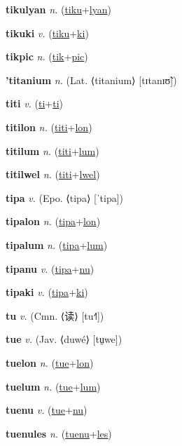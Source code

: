 \textbf{\hypertarget{tikulyan}{tikulyan}} \textit{n.} (\hyperlink{tiku}{tiku}+\allowbreak \hyperlink{lyan}{lyan})


\textbf{\hypertarget{tikuki}{tikuki}} \textit{v.} (\hyperlink{tiku}{tiku}+\allowbreak \hyperlink{ki}{ki})


\textbf{\hypertarget{tikpic}{tikpic}} \textit{n.} (\hyperlink{tik}{tik}+\allowbreak \hyperlink{pic}{pic})


\textbf{\hypertarget{'titanium}{'titanium}} \textit{n.} (Lat. ⟨titanium⟩ [tɪtanɪʊ̃])


\textbf{\hypertarget{titi}{titi}} \textit{v.} (\hyperlink{ti}{ti}+\allowbreak \hyperlink{ti}{ti})


\textbf{\hypertarget{titilon}{titilon}} \textit{n.} (\hyperlink{titi}{titi}+\allowbreak \hyperlink{lon}{lon})


\textbf{\hypertarget{titilum}{titilum}} \textit{n.} (\hyperlink{titi}{titi}+\allowbreak \hyperlink{lum}{lum})


\textbf{\hypertarget{titilwel}{titilwel}} \textit{n.} (\hyperlink{titi}{titi}+\allowbreak \hyperlink{lwel}{lwel})


\textbf{\hypertarget{tipa}{tipa}} \textit{v.} (Epo. ⟨tipa⟩ [ˈtipa])


\textbf{\hypertarget{tipalon}{tipalon}} \textit{n.} (\hyperlink{tipa}{tipa}+\allowbreak \hyperlink{lon}{lon})


\textbf{\hypertarget{tipalum}{tipalum}} \textit{n.} (\hyperlink{tipa}{tipa}+\allowbreak \hyperlink{lum}{lum})


\textbf{\hypertarget{tipanu}{tipanu}} \textit{v.} (\hyperlink{tipa}{tipa}+\allowbreak \hyperlink{nu}{nu})


\textbf{\hypertarget{tipaki}{tipaki}} \textit{v.} (\hyperlink{tipa}{tipa}+\allowbreak \hyperlink{ki}{ki})


\textbf{\hypertarget{tu}{tu}} \textit{v.} (Cmn. ⟨{\chinese{}读}⟩ [tu˧˥])


\textbf{\hypertarget{tue}{tue}} \textit{v.} (Jav. ⟨duwé⟩ [tṳwe])


\textbf{\hypertarget{tuelon}{tuelon}} \textit{n.} (\hyperlink{tue}{tue}+\allowbreak \hyperlink{lon}{lon})


\textbf{\hypertarget{tuelum}{tuelum}} \textit{n.} (\hyperlink{tue}{tue}+\allowbreak \hyperlink{lum}{lum})


\textbf{\hypertarget{tuenu}{tuenu}} \textit{v.} (\hyperlink{tue}{tue}+\allowbreak \hyperlink{nu}{nu})


\textbf{\hypertarget{tuenules}{tuenules}} \textit{n.} (\hyperlink{tuenu}{tuenu}+\allowbreak \hyperlink{les}{les})


